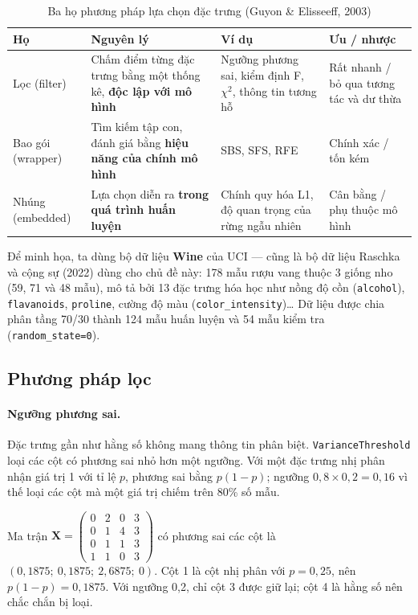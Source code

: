 \begin{table}[H]
\centering
\begin{tabular}{|p{2.4cm}|p{4.6cm}|p{2.9cm}|p{3.2cm}|}
\hline
\textbf{Họ} & \textbf{Nguyên lý} & \textbf{Ví dụ} & \textbf{Ưu / nhược} \\
\hline
Lọc (filter) & Chấm điểm từng đặc trưng bằng một thống kê, \textbf{độc lập với mô hình} & Ngưỡng phương sai, kiểm định F, $\chi^2$, thông tin tương hỗ & Rất nhanh / bỏ qua tương tác và dư thừa \\ \hline
Bao gói (wrapper) & Tìm kiếm tập con, đánh giá bằng \textbf{hiệu năng của chính mô hình} & SBS, SFS, RFE & Chính xác / tốn kém \\ \hline
Nhúng (embedded) & Lựa chọn diễn ra \textbf{trong quá trình huấn luyện} & Chính quy hóa L1, độ quan trọng của rừng ngẫu nhiên & Cân bằng / phụ thuộc mô hình \\ \hline
\end{tabular}
\caption{Ba họ phương pháp lựa chọn đặc trưng (Guyon \& Elisseeff, 2003)}
\label{tab:fs-families}
\end{table}

Để minh họa, ta dùng bộ dữ liệu \textbf{Wine} của UCI --- cũng là bộ dữ liệu Raschka và cộng sự (2022) dùng cho chủ đề này: 178 mẫu rượu vang thuộc 3 giống nho (59, 71 và 48 mẫu), mô tả bởi 13 đặc trưng hóa học như nồng độ cồn (\texttt{alcohol}), \texttt{flavanoids}, \texttt{proline}, cường độ màu (\texttt{color\_intensity})\ldots{} Dữ liệu được chia phân tầng 70/30 thành 124 mẫu huấn luyện và 54 mẫu kiểm tra (\texttt{random\_state=0}).

\subsection{Phương pháp lọc}

\paragraph{Ngưỡng phương sai.} Đặc trưng gần như hằng số không mang thông tin phân biệt. \texttt{VarianceThreshold} loại các cột có phương sai nhỏ hơn một ngưỡng. Với một đặc trưng nhị phân nhận giá trị 1 với tỉ lệ $p$, phương sai bằng $p(1 - p)$; ngưỡng $0{,}8 \times 0{,}2 = 0{,}16$ vì thế loại các cột mà một giá trị chiếm trên 80\% số mẫu.

\begin{example}
Ma trận $\mathbf{X} = \begin{pmatrix} 0 & 2 & 0 & 3 \\ 0 & 1 & 4 & 3 \\ 0 & 1 & 1 & 3 \\ 1 & 1 & 0 & 3 \end{pmatrix}$ có phương sai các cột là $(0{,}1875;\ 0{,}1875;\ 2{,}6875;\ 0)$. Cột 1 là cột nhị phân với $p = 0{,}25$, nên $p(1 - p) = 0{,}1875$. Với ngưỡng 0,2, chỉ cột 3 được giữ lại; cột 4 là hằng số nên chắc chắn bị loại.
\end{example}


